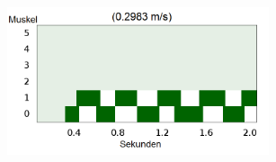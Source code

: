 \documentclass{beamer}
\begin{document}
\begin{frame}
\begin{columns}
\begin{figure}
		\end{figure}
		\begin{figure}
			\includegraphics[width=0.9\textwidth]{img/hum31.png}
		\end{figure}
	\end{columns}
\end{frame}
\end{document}
